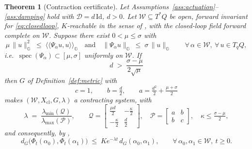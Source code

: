 \documentclass[11pt,a4paper]{article}
\newcommand{\Gm}{\mathbb{G}}                      %
\newcommand{\ipG}[2]{\langle\!\langle #1 , #2 \rangle\!\rangle_{\Gm}}
\newcommand{\Damp}{\mathcal{D}}
\newcommand{\Stiff}{\Psi}
\newcommand{\id}{\mathrm{Id}}
\newcommand{\normG}[1]{\lVert #1 \rVert_{\Gm}}
\newcommand{\Tstar}{T^{*}Q}
\DeclareMathOperator{\spec}{spec}
\theoremstyle{plain}
\newtheorem{theorem}{Theorem}[section]
\theoremstyle{definition}
\theoremstyle{remark}
\begin{document}
\begin{theorem}[Contraction certificate]
\label{thm:main}
Let Assumptions~\ref{ass:actuation}--\ref{ass:damping} hold with
$\Damp = d\,\id$, $d>0$. Let $\mathcal{W}\subseteq\Tstar$ be open, forward
invariant for \eqref{eq:closedloop}, $K$-reachable in the sense of
\cite[Def.~2.2]{SB13}, with the closed-loop field forward complete on
$\mathcal{W}$. Suppose there exist $0 < \mu \le \sigma$ with
\begin{equation}
  \mu\,\normG{u}^2 \;\le\; \ipG{\Stiff_\alpha u}{u}
  \quad\text{and}\quad
  \normG{\Stiff_\alpha u} \;\le\; \sigma\,\normG{u}
  \qquad \forall\,\alpha\in\mathcal{W},\ \forall\,u\in T_qQ,
  \label{eq:mu-sigma}
\end{equation}
i.e.\ $\spec(\Stiff_\alpha)\subset[\mu,\sigma]$ uniformly on $\mathcal{W}$. If
\begin{equation}
  \boxed{\;\; d \;>\; \frac{\sigma-\mu}{2\sqrt{\mu}} \;\;}
  \label{eq:main-condition}
\end{equation}
then $G$ of Definition~\ref{def:metric} with
\begin{equation}
  c = 1, \qquad b = \tfrac{d}{2}, \qquad a = \tfrac{d^2}{2} + \tfrac{\mu+\sigma}{2}
  \label{eq:gains}
\end{equation}
makes $(\mathcal{W}, X_{\mathrm{cl}}, G, \lambda)$ a contracting system, with
\begin{equation}
  \lambda \;=\; \frac{\lambda_{\min}(\mathcal{Q})}{\lambda_{\max}(\mathcal{P})},
  \qquad
  \mathcal{Q} = \begin{bmatrix} \tfrac{\mu d}{2} & -\tfrac{\kappa}{2}\\[2pt]
                                -\tfrac{\kappa}{2} & \tfrac{d}{2}\end{bmatrix},
  \quad
  \mathcal{P} = \begin{bmatrix} a & b\\ b & c\end{bmatrix},
  \quad
  \kappa \le \tfrac{\sigma-\mu}{2},
  \label{eq:rate}
\end{equation}
and consequently, by \cite[Thm.~2.3]{SB13},
\[
  d_G\big(\Phi_t(\alpha_0),\Phi_t(\alpha_1)\big) \;\le\;
  K e^{-\lambda t}\, d_G(\alpha_0,\alpha_1),
  \qquad \forall\,\alpha_0,\alpha_1\in\mathcal{W},\ t\ge0 .
\]
\end{theorem}
\end{document}
